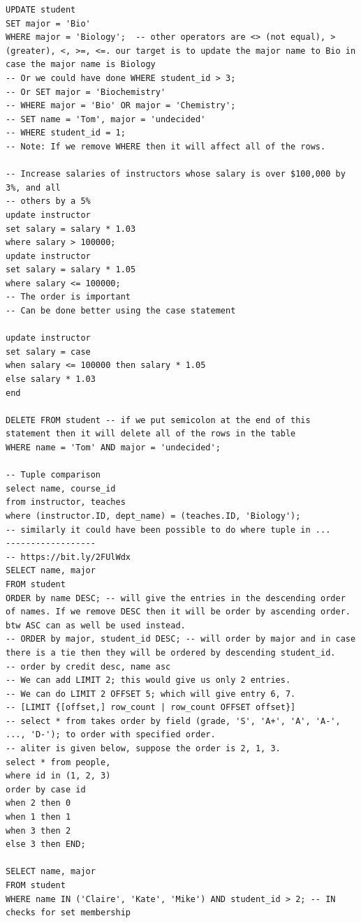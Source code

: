 \documentclass[8pt, a4paper, oneside, twocolumn]{extarticle}
\begin{document}
\begin{verbatim}
UPDATE student
SET major = 'Bio'
WHERE major = 'Biology';  -- other operators are <> (not equal), > (greater), <, >=, <=. our target is to update the major name to Bio in case the major name is Biology
-- Or we could have done WHERE student_id > 3;
-- Or SET major = 'Biochemistry'
-- WHERE major = 'Bio' OR major = 'Chemistry';
-- SET name = 'Tom', major = 'undecided'
-- WHERE student_id = 1;
-- Note: If we remove WHERE then it will affect all of the rows.

-- Increase salaries of instructors whose salary is over $100,000 by 3%, and all
-- others by a 5%
update instructor
set salary = salary * 1.03
where salary > 100000;
update instructor
set salary = salary * 1.05
where salary <= 100000;
-- The order is important
-- Can be done better using the case statement

update instructor
set salary = case
when salary <= 100000 then salary * 1.05
else salary * 1.03
end

DELETE FROM student -- if we put semicolon at the end of this statement then it will delete all of the rows in the table
WHERE name = 'Tom' AND major = 'undecided';

-- Tuple comparison
select name, course_id
from instructor, teaches
where (instructor.ID, dept_name) = (teaches.ID, 'Biology');
-- similarly it could have been possible to do where tuple in ...
------------------
-- https://bit.ly/2FUlWdx
SELECT name, major
FROM student
ORDER by name DESC; -- will give the entries in the descending order of names. If we remove DESC then it will be order by ascending order. btw ASC can as well be used instead.
-- ORDER by major, student_id DESC; -- will order by major and in case there is a tie then they will be ordered by descending student_id.
-- order by credit desc, name asc
-- We can add LIMIT 2; this would give us only 2 entries.
-- We can do LIMIT 2 OFFSET 5; which will give entry 6, 7.
-- [LIMIT {[offset,] row_count | row_count OFFSET offset}]
-- select * from takes order by field (grade, 'S', 'A+', 'A', 'A-', ..., 'D-'); to order with specified order.
-- aliter is given below, suppose the order is 2, 1, 3.
select * from people, 
where id in (1, 2, 3)
order by case id
when 2 then 0
when 1 then 1
when 3 then 2
else 3 then END;

SELECT name, major
FROM student
WHERE name IN ('Claire', 'Kate', 'Mike') AND student_id > 2; -- IN checks for set membership
\end{verbatim}
\end{document}
